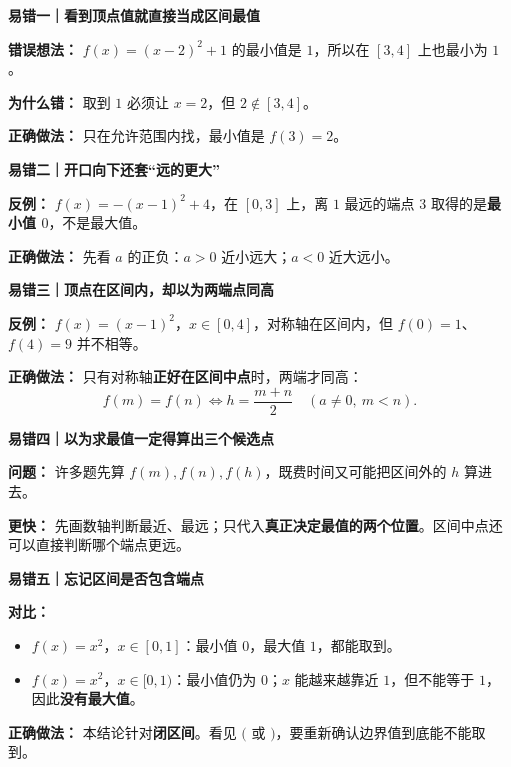 \clearpage
\begin{trapbox}
\textbf{\textcolor{CTrap}{易错一｜看到顶点值就直接当成区间最值}}



\textbf{错误想法：} $f(x)=(x-2)^2+1$ 的最小值是 $1$，所以在 $[3,4]$ 上也最小为 $1$。

\textbf{为什么错：} 取到 $1$ 必须让 $x=2$，但 $2\notin[3,4]$。

\textbf{正确做法：} 只在允许范围内找，最小值是 $f(3)=2$。

\medskip

\end{trapbox}
\clearpage
\begin{trapbox}
\textbf{\textcolor{CTrap}{易错二｜开口向下还套“远的更大”}}



\textbf{反例：} $f(x)=-(x-1)^2+4$，在 $[0,3]$ 上，离 $1$ 最远的端点 $3$ 取得的是\textbf{最小值 $0$}，不是最大值。

\textbf{正确做法：} 先看 $a$ 的正负：$a>0$ 近小远大；$a<0$ 近大远小。

\medskip

\end{trapbox}
\clearpage
\begin{trapbox}
\textbf{\textcolor{CTrap}{易错三｜顶点在区间内，却以为两端点同高}}



\textbf{反例：} $f(x)=(x-1)^2$，$x\in[0,4]$，对称轴在区间内，但 $f(0)=1$、$f(4)=9$ 并不相等。

\textbf{正确做法：} 只有对称轴\textbf{正好在区间中点}时，两端才同高：
\[
 f(m)=f(n)\Longleftrightarrow h=\frac{m+n}{2}\quad(a\ne0,\ m<n).
\]

\medskip

\end{trapbox}
\clearpage
\begin{trapbox}
\textbf{\textcolor{CTrap}{易错四｜以为求最值一定得算出三个候选点}}



\textbf{问题：} 许多题先算 $f(m),f(n),f(h)$，既费时间又可能把区间外的 $h$ 算进去。

\textbf{更快：} 先画数轴判断最近、最远；只代入\textbf{真正决定最值的两个位置}。区间中点还可以直接判断哪个端点更远。

\medskip

\end{trapbox}
\clearpage
\begin{trapbox}
\textbf{\textcolor{CTrap}{易错五｜忘记区间是否包含端点}}



\textbf{对比：}
\begin{itemize}[leftmargin=*,itemsep=0.2em]
\item $f(x)=x^2$，$x\in[0,1]$：最小值 $0$，最大值 $1$，都能取到。
\item $f(x)=x^2$，$x\in[0,1)$：最小值仍为 $0$；$x$ 能越来越靠近 $1$，但不能等于 $1$，因此\textbf{没有最大值}。
\end{itemize}
\textbf{正确做法：} 本结论针对\textbf{闭区间}。看见 $($ 或 $)$，要重新确认边界值到底能不能取到。

\medskip

\end{trapbox}
